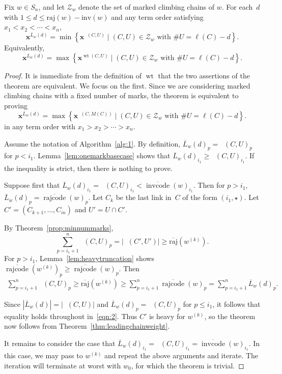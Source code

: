 \documentclass[ALCO]{cedram}
\newcommand{\absrajcode}[1]{\mathrm{raj}(#1)}
\newcommand{\absoverrajcode}[1]{\overline{\mathrm{raj}}(#1)}
\newcommand{\absinvcode}[1]{\mathrm{inv}(#1)}
\DeclareMathOperator{\wt}{\mathrm{wt}}
\DeclareMathOperator{\dwt}{\overline{\mathrm{wt}}}
\DeclareMathOperator{\cc}{\mathrm{invcode}}
\newcommand{\occ}{\overline{\cc}}
\DeclareMathOperator{\rr}{\mathrm{rajcode}}
\newcommand{\orr}{\overline{\rr}}
\newcommand{\LL}{\overline{L}}
\begin{document}
\begin{theorem}
	\label{thm:interpolatingleadingterms}
	Fix $w\in S_n$, and let $\mathcal{Z}_w$ denote the set of marked climbing chains of $w$. For each~$d$ with $1\leq d\leq \absrajcode{w}-\absinvcode{w}$ and any term order satisfying $x_1<x_2<\cdots<x_n$,
	\[\bm{x}^{\LL_w(d)} = \min \left\{\bm{x}^{\dwt(C,U)} \mid (C,U)\in \mathcal{Z}_w \mbox{ with } \#U = 
	\ell(C) - d \right\}. \] 
	Equivalently, 
	\[\bm{x}^{L_w(d)} = \max \left\{\bm{x}^{\wt(C,U)} \mid (C,U)\in \mathcal{Z}_w \mbox{ with } \#U = 
	\ell(C) - d \right\}. \] 
\end{theorem}
\begin{proof}
	It is immediate from the definition of $\wt$ that the two assertions of the theorem are equivalent. We focus on the first. Since we are considering marked climbing chains with a fixed number of marks, the theorem is equivalent to proving
	\[\bm{x}^{\LL_w(d)} = \max \left\{\bm{x}^{\dwt(C,M(C))} \mid (C,U)\in \mathcal{Z}_w \mbox{ with } \#U = 
	\ell(C) - d \right\}. \] 
	in any term order with $x_1>x_2>\cdots>x_n$. 
	
	Assume the notation of Algorithm~\ref{alg:1}. 
	By definition, $\LL_w(d)_{p}=\dwt(C,U)_{p}$ for $p<i_1$. Lemma~\ref{lem:onemarkbasecase} shows that $\LL_w(d)_{i_1}\geq\dwt(C,U)_{i_1}$. If the inequality is strict, then there is nothing to prove. 
	
	Suppose first that $\LL_w(d)_{i_1}=\dwt(C,U)_{i_1}<\occ(w)_{i_1}$. Then for $p>i_1$, $\LL_w(d)_p=\orr(w)_p$. 
	Let $C_k$ be the last link in~$C$ of the form $(i_1,\star)$. Let $C'=(C_{k+1},\ldots,C_m)$ and $U'=U\cap C'$.
	
	By Theorem~\ref{prop:minnummarks},
	\[\sum_{p=i_1+1}^n \dwt(C,U)_p = |\dwt(C',U')|\geq \absoverrajcode{w^{(k)}}. \]
	For $p>i_1$, Lemma~\ref{lem:heavytruncation} shows $\orr(w^{(k)})_p\geq \orr(w)_p$. Then
	\begin{align}
		\label{eqn:2}
		\sum_{p=i_1+1}^n \dwt(C,U)_p \geq \absoverrajcode{w^{(k)}}\geq \sum_{p=i_1+1}^n\orr(w)_p = \sum_{p=i_1+1}^n\LL_w(d)_p.
	\end{align}
	
	Since $|\LL_w(d)| = |\dwt(C,U)|$ and $\LL_w(d)_p = \dwt(C,U)_p$ for $p\leq i_1$, it follows that equality holds throughout in~\eqref{eqn:2}. Thus $C'$ is heavy for $w^{(k)}$, so the theorem now follows from Theorem~\ref{thm:leadingchainweight}.
	
	It remains to consider the case that $\LL_w(d)_{i_1}=\dwt(C,U)_{i_1}=\occ(w)_{i_1}$. In this case, we may pass to $w^{(k)}$ and repeat the above arguments and iterate. The iteration will terminate at worst with $w_0$, for which the theorem is trivial.
\end{proof}
\end{document}
